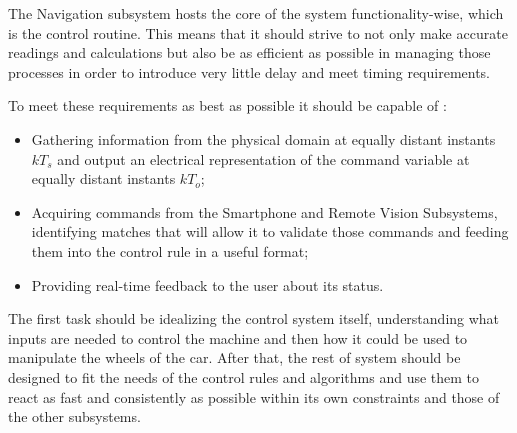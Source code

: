 The Navigation subsystem hosts the core of the system functionality-wise, which is the control routine. This means that it should strive to not only make accurate readings and calculations but also be as efficient as possible in managing those processes in order to introduce very little delay and meet timing requirements. 

To meet these requirements as best as possible it should be capable of :

\begin{itemize}
    \item Gathering information from the physical domain at equally distant instants $kT_s$ and output an electrical representation of the command variable at equally distant instants $kT_o$;
    \item Acquiring commands from the Smartphone and Remote Vision Subsystems, identifying matches that will allow it to validate those commands and feeding them into the control rule in a useful format;
    \item Providing real-time feedback to the user about its status.
\end{itemize}


The first task should be idealizing the control system itself, understanding what inputs are needed to control the machine and then how it could be used to manipulate the wheels of the car. After that, the rest of system should be designed to fit the needs of the control rules and algorithms and use them to react as fast and consistently as possible within its own constraints and those of the other subsystems.